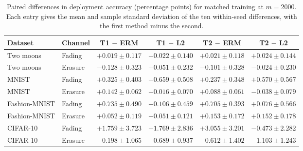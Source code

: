\begin{table}[t]
\centering
\caption{Paired differences in deployment accuracy (percentage points) for matched training at $m=2000$. Each entry gives the mean and sample standard deviation of the ten within-seed differences, with the first method minus the second.}
\label{tab:replication-differences}
\begin{tabular*}{\linewidth}{@{\extracolsep{\fill}}llcccc@{}}
\toprule
Dataset & Channel & T1 $-$ ERM & T1 $-$ L2 & T2 $-$ ERM & T2 $-$ L2 \\
\midrule
Two moons & Fading & \(+0.019\pm0.117\) & \(+0.022\pm0.140\) & \(+0.021\pm0.118\) & \(+0.024\pm0.144\) \\
Two moons & Erasure & \(-0.128\pm0.323\) & \(-0.051\pm0.232\) & \(-0.101\pm0.328\) & \(-0.024\pm0.230\) \\
MNIST & Fading & \(+0.325\pm0.403\) & \(+0.659\pm0.508\) & \(+0.237\pm0.348\) & \(+0.570\pm0.567\) \\
MNIST & Erasure & \(+0.142\pm0.062\) & \(+0.016\pm0.070\) & \(+0.088\pm0.061\) & \(-0.038\pm0.079\) \\
Fashion-MNIST & Fading & \(+0.735\pm0.490\) & \(+0.106\pm0.459\) & \(+0.705\pm0.393\) & \(+0.076\pm0.566\) \\
Fashion-MNIST & Erasure & \(+0.052\pm0.119\) & \(+0.051\pm0.121\) & \(+0.153\pm0.172\) & \(+0.152\pm0.178\) \\
CIFAR-10 & Fading & \(+1.759\pm3.723\) & \(-1.769\pm2.836\) & \(+3.055\pm3.201\) & \(-0.473\pm2.282\) \\
CIFAR-10 & Erasure & \(-0.198\pm1.065\) & \(-0.689\pm0.937\) & \(-0.612\pm1.402\) & \(-1.103\pm1.243\) \\
\bottomrule
\end{tabular*}
\end{table}
